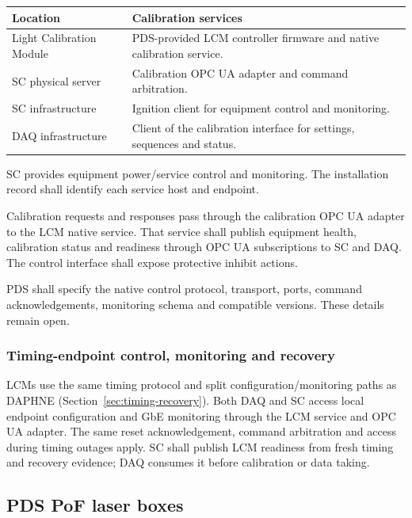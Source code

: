 \begin{center}\small
\begin{tabular}{L{0.25\textwidth}L{0.68\textwidth}}
\toprule
\textbf{Location} & \textbf{Calibration services} \\
\midrule
Light Calibration Module & PDS-provided LCM controller firmware and native calibration service. \\
SC physical server & Calibration OPC UA adapter and command arbitration. \\
SC infrastructure & Ignition client for equipment control and monitoring. \\
DAQ infrastructure & Client of the calibration interface for settings, sequences and status. \\
\bottomrule
\end{tabular}
\end{center}
SC provides equipment power/service control and monitoring. The installation
record shall identify each service host and endpoint.

Calibration requests and responses pass through the calibration OPC UA adapter
to the LCM native service. That service shall publish equipment health,
calibration status and readiness through OPC UA subscriptions to SC and DAQ.
The control interface shall expose protective inhibit actions.

PDS shall specify the native control protocol, transport, ports, command acknowledgements,
monitoring schema and compatible versions. These details remain open.

\subsubsection{Timing-endpoint control, monitoring and recovery}

LCMs use the same timing protocol and split configuration/monitoring paths as
DAPHNE (Section~\ref{sec:timing-recovery}). Both DAQ and SC access local endpoint
configuration and GbE monitoring through the LCM service and OPC UA adapter. The same reset
acknowledgement, command arbitration and access during timing outages apply.
SC shall publish LCM readiness from fresh timing and recovery evidence;
DAQ consumes it before calibration or data taking.

\subsection{PDS PoF laser boxes}
\label{sec:services-pof}

